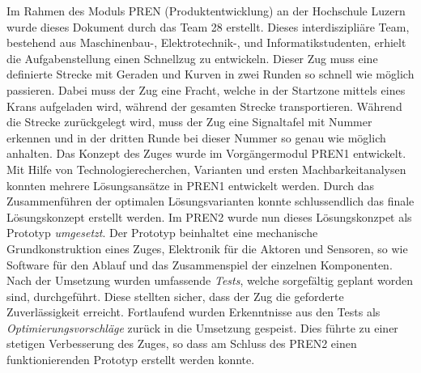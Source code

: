 \documentclass[../../main.tex]{subfiles}
\begin{document}
Im Rahmen des Moduls PREN (Produktentwicklung) an der Hochschule Luzern wurde dieses Dokument durch das Team 28
erstellt. Dieses interdiszipliäre Team, bestehend aus Maschinenbau-, Elektrotechnik-, und Informatikstudenten, erhielt die Aufgabenstellung einen Schnellzug zu entwickeln. Dieser Zug muss eine definierte Strecke mit Geraden und Kurven in zwei Runden so schnell wie möglich passieren. Dabei muss der Zug eine Fracht, welche in der Startzone mittels eines Krans aufgeladen wird, während der gesamten Strecke transportieren. Während die Strecke zurückgelegt wird, muss der Zug eine Signaltafel mit Nummer erkennen und in der dritten Runde bei dieser Nummer so genau wie möglich anhalten. Das Konzept des Zuges wurde im Vorgängermodul PREN1 entwickelt. Mit Hilfe von Technologierecherchen, Varianten und ersten Machbarkeitanalysen konnten mehrere Lösungsansätze in PREN1 entwickelt werden. Durch das Zusammenführen der optimalen Lösungsvarianten konnte schlussendlich das finale Lösungskonzept erstellt werden. Im PREN2 wurde nun dieses Lösungskonzpet als Prototyp \textit{umgesetzt}. Der Prototyp beinhaltet eine mechanische Grundkonstruktion eines Zuges, Elektronik für die Aktoren und Sensoren, so wie Software für den Ablauf und das Zusammenspiel der einzelnen Komponenten. Nach der Umsetzung wurden umfassende \textit{Tests}, welche sorgefältig geplant worden sind, durchgeführt. Diese stellten sicher, dass der Zug die geforderte Zuverlässigkeit erreicht. Fortlaufend wurden Erkenntnisse aus den Tests als \textit{Optimierungsvorschläge} zurück in die Umsetzung gespeist. Dies führte zu einer stetigen Verbesserung des Zuges, so dass am Schluss des PREN2 einen funktionierenden Prototyp erstellt werden konnte.
\end{document}
